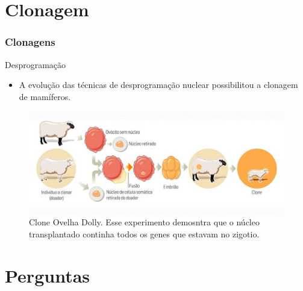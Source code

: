 \documentclass[brazil]{beamer}
\begin{document}
\section{Clonagem}

\begin{frame}
\frametitle{Clonagens}

   \begin{block}{Desprogramação}
    \footnotesize 
	\begin{itemize}
	    \item A evolução das técnicas de desprogramação nuclear possibilitou a clonagem de mamíferos.
	\end{itemize}
   \end{block}
   \begin{figure}
      \includegraphics[scale=0.5]{clone.jpg}
      \caption{\tiny Clone Ovelha Dolly. Esse experimento demosntra que o núcleo transplantado continha todos os genes que estavam no zigotio.}
   \end{figure}
\end{frame}

\section{Perguntas}
\end{document}
